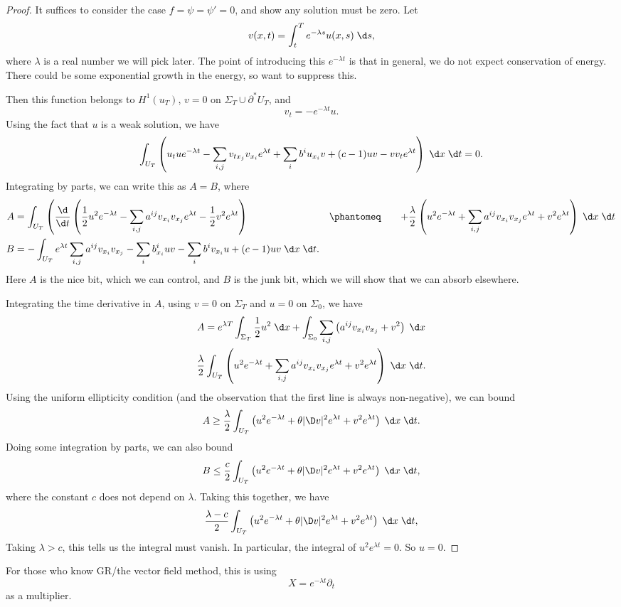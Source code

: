 \documentclass[a4paper]{article}
\begin{document}
\begin{proof}
  It suffices to consider the case $f = \psi = \psi' = 0$, and show any solution must be zero. Let
  \[
    v(x, t) = \int_t^T e^{-\lambda s} u(x, s)\;\d s,
  \]
  where $\lambda$ is a real number we will pick later. The point of introducing this $e^{-\lambda t}$ is that in general, we do not expect conservation of energy. There could be some exponential growth in the energy, so want to suppress this.

  Then this function belongs to $H^1(u_T)$, $v = 0$ on $\Sigma_T \cup \partial^* U_T$, and
  \[
    v_t = -e^{-\lambda t} u.
  \]
  Using the fact that $u$ is a weak solution, we have
  \[
    \int_{U_T} \left( u_t u e^{- \lambda t} - \sum_{i, j} v_{t x_j} v_{x_i} e^{\lambda t} + \sum_i b^i u_{x_i} v + (c - 1) uv - v v_t e^{\lambda t}\right)\;\d x \;\d t = 0.
  \]
  Integrating by parts, we can write this as $A = B$, where
  \begin{align*}
    A &= \int_{U_T} \left( \frac{\d}{\d t} \left(\frac{1}{2} u^2 e^{-\lambda t} - \sum_{i, j} a^{ij} v_{x_i} v_{x_j} e^{\lambda t} - \frac{1}{2} v^2 e^{\lambda t}\right) \right.
    &\phantomeq \hphantom{\int_{U_T}} \left.+ \frac{\lambda}{2} \left(u^2 e^{-\lambda t} + \sum_{i, j} a^{ij} v_{x_i} v_{x_j} e^{\lambda t} + v^2 e^{\lambda t}\right) \;\d x\;\d t\right.\\
    B &= - \int_{U_T} e^{\lambda t} \sum_{i, j} a^{ij} v_{x_i} v_{x_j} - \sum_i b^i_{x_i} uv - \sum_i b^i v_{x_i} u + (c - 1) uv \;\d x\;\d t.
  \end{align*}
  Here $A$ is the nice bit, which we can control, and $B$ is the junk bit, which we will show that we can absorb elsewhere.

  Integrating the time derivative in $A$, using $v = 0$ on $\Sigma_T$ and $u = 0$ on $\Sigma_0$, we have
  \begin{multline*}
    A = e^{\lambda T} \int_{\Sigma_T} \frac{1}{2} u^2 \;\d x + \int_{\Sigma_0} \sum_{i, j} \left(a^{ij} v_{x_i} v_{x_j} + v^2\right) \;\d x\\
    \frac{\lambda}{2} \int_{U_T}\left(u^2 e^{-\lambda t} + \sum_{i, j} a^{ij} v_{x_i} v_{x_j} e^{\lambda t} + v^2 e^{\lambda t}\right) \;\d x\;\d t.
  \end{multline*}
  Using the uniform ellipticity condition (and the observation that the first line is always non-negative), we can bound
  \[
    A \geq \frac{\lambda}{2} \int_{U_T} \left(u^2 e^{-\lambda t} + \theta |\D v|^2 e^{\lambda t} + v^2 e^{\lambda t}\right)\;\d x\;\d t.
  \]
  Doing some integration by parts, we can also bound
  \[
    B \leq \frac{c}{2} \int_{U_T} \left(u^2 e^{-\lambda t} + \theta |\D v|^2 e^{\lambda t} + v^2 e^{\lambda t}\right)\;\d x\;\d t,
  \]
  where the constant $c$ does not depend on $\lambda$. Taking this together, we have
  \[
    \frac{\lambda - c}{2} \int_{U_T} \left(u^2 e^{-\lambda t} + \theta |\D v|^2 e^{\lambda t} + v^2 e^{\lambda t}\right)\;\d x\;\d t,
  \]
  Taking $\lambda > c$, this tells us the integral must vanish. In particular, the integral of $u^2 e^{\lambda t} = 0$. So $u = 0$.
\end{proof}
For those who know GR/the vector field method, this is using
\[
  X = e^{-\lambda t} \partial_t
\]
as a multiplier.
\end{document}
